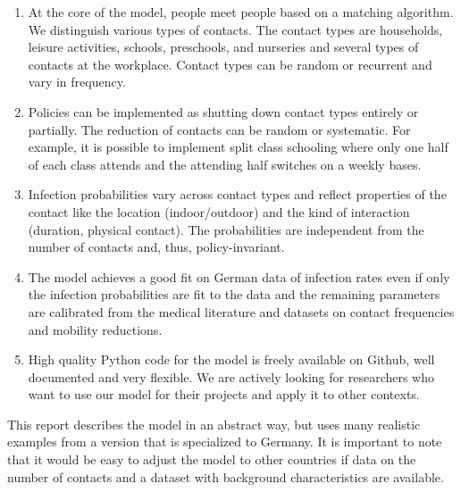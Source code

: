 \begin{enumerate}
    \item At the core of the model, people meet people based on a matching algorithm. We
          distinguish various types of contacts. The contact types are households,
          leisure activities, schools, preschools, and nurseries and several types of
          contacts at the workplace. Contact types can be random or recurrent and vary
          in frequency.

    \item Policies can be implemented as shutting down contact types entirely or
          partially. The reduction of contacts can be random or systematic. For example,
          it is possible to implement split class schooling where only one half of each
          class attends and the attending half switches on a weekly bases.

    \item Infection probabilities vary across contact types and reflect properties of
          the contact like the location (indoor/outdoor) and the kind of interaction
          (duration, physical contact). The probabilities are independent from the
          number of contacts and, thus, policy-invariant.

    \item The model achieves a good fit on German data of infection rates even if only
          the infection probabilities are fit to the data and the remaining parameters
          are calibrated from the medical literature and datasets on contact
          frequencies and mobility reductions.

    \item High quality Python code for the model is freely available on Github, well
          documented and very flexible\footnotemark. We are actively looking for
          researchers who want to use our model for their projects and apply it to other
          contexts.
\end{enumerate}


This report describes the model in an abstract way, but uses many realistic examples
from a version that is specialized to Germany. It is important to note that it would
be easy to adjust the model to other countries if data on the number of contacts and
a dataset with background characteristics are available.

